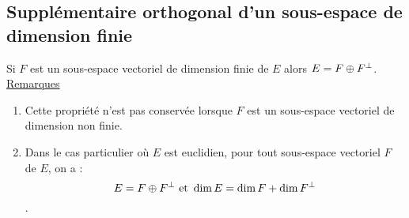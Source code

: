 \subsection{Supplémentaire orthogonal d’un sous-espace de dimension finie}
\begin{defprop}
    Si \(F\) est un sous-espace vectoriel de dimension finie de \(E\) alors \(E = F \oplus F^{\perp}\).\\
    \underline{Remarques}\\
    \begin{enumerate}
        \item Cette propriété n’est pas conservée lorsque \(F\) est un sous-espace vectoriel de dimension non finie.
        \item Dans le cas particulier où \(E\) est euclidien, pour tout sous-espace vectoriel \(F\) de \(E\), on a :
            \[E = F \oplus F^{\perp} \text{ et }\dim E = \dim F + \dim F^{\perp}\].
    \end{enumerate}
\end{defprop}
